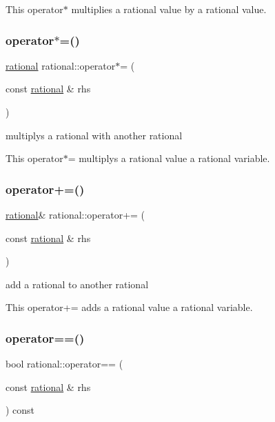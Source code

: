 This operator$\ast$ multiplies a rational value by a rational value. \mbox{\label{classrational_a2b5729aef261d16cd18ff7c7fcbf8c6e}} 
\subsubsection{\texorpdfstring{operator$\ast$=()}{operator*=()}}
{\footnotesize\ttfamily \hyperlink{classrational}{rational} rational\+::operator$\ast$= (\begin{DoxyParamCaption}\item[{const \hyperlink{classrational}{rational} \&}]{rhs }\end{DoxyParamCaption})\hspace{0.3cm}{\ttfamily [inline]}}



multiplys a rational with another rational 

This operator$\ast$= multiplys a rational value a rational variable. \mbox{\label{classrational_a9b83ad0c803d2ac242b42e71d954a356}} 
\subsubsection{\texorpdfstring{operator+=()}{operator+=()}}
{\footnotesize\ttfamily \hyperlink{classrational}{rational}\& rational\+::operator+= (\begin{DoxyParamCaption}\item[{const \hyperlink{classrational}{rational} \&}]{rhs }\end{DoxyParamCaption})\hspace{0.3cm}{\ttfamily [inline]}}



add a rational to another rational 

This operator+= adds a rational value a rational variable. \mbox{\label{classrational_a8b565720ea15ddfb17ea202e27698478}} 
\subsubsection{\texorpdfstring{operator==()}{operator==()}}
{\footnotesize\ttfamily bool rational\+::operator== (\begin{DoxyParamCaption}\item[{const \hyperlink{classrational}{rational} \&}]{rhs }\end{DoxyParamCaption}) const\hspace{0.3cm}{\ttfamily [inline]}}



